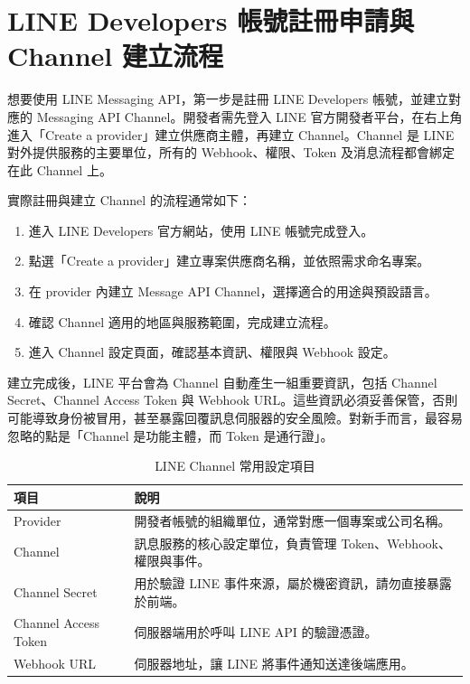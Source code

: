 \section{LINE Developers 帳號註冊申請與 Channel 建立流程}

想要使用 LINE Messaging API，第一步是註冊 LINE Developers 帳號，並建立對應的 Messaging API Channel。開發者需先登入 LINE 官方開發者平台，在右上角進入「Create a provider」建立供應商主體，再建立 Channel。Channel 是 LINE 對外提供服務的主要單位，所有的 Webhook、權限、Token 及消息流程都會綁定在此 Channel 上。

實際註冊與建立 Channel 的流程通常如下：
\begin{enumerate}[leftmargin=2em]
    \item 進入 LINE Developers 官方網站，使用 LINE 帳號完成登入。
    \item 點選「Create a provider」建立專案供應商名稱，並依照需求命名專案。
    \item 在 provider 內建立 Message API Channel，選擇適合的用途與預設語言。
    \item 確認 Channel 適用的地區與服務範圍，完成建立流程。
    \item 進入 Channel 設定頁面，確認基本資訊、權限與 Webhook 設定。
\end{enumerate}

建立完成後，LINE 平台會為 Channel 自動產生一組重要資訊，包括 Channel Secret、Channel Access Token 與 Webhook URL。這些資訊必須妥善保管，否則可能導致身份被冒用，甚至暴露回覆訊息伺服器的安全風險。對新手而言，最容易忽略的點是「Channel 是功能主體，而 Token 是通行證」。

\begin{table}[H]
\centering
\caption{LINE Channel 常用設定項目}
\begin{tabular}{p{} p{}}
\toprule
項目 & 說明 \\
\midrule
Provider & 開發者帳號的組織單位，通常對應一個專案或公司名稱。 \\
Channel & 訊息服務的核心設定單位，負責管理 Token、Webhook、權限與事件。 \\
Channel Secret & 用於驗證 LINE 事件來源，屬於機密資訊，請勿直接暴露於前端。 \\
Channel Access Token & 伺服器端用於呼叫 LINE API 的驗證憑證。 \\
Webhook URL & 伺服器地址，讓 LINE 將事件通知送達後端應用。 \\
\bottomrule
\end{tabular}
\end{table}


